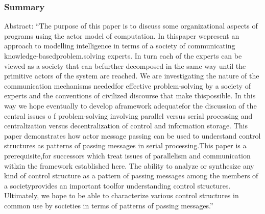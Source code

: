 \subsubsection*{Summary}
Abstract: ``The purpose of this paper is to discuss some organizational aspects of programs using the actor model of computation. In thispaper wepresent an approach to modelling intelligence in terms of a society of communicating knowledge-basedproblem.solving experts. In turn each of the experts can be viewed as a society that can befurther decomposed in the same way until the primitive actors of the system are reached. We are investigating the nature of the communication mechanisms neededfor effective problem-solving by a society of experts and the conventions of civilized discourse that make thispossible. In this way we hope eventually to develop aframework adequatefor the discussion of the central issues o f problem-solving involving parallel versus serial processing and centralization versus decentralization of control and information storage. This paper demonstrates how actor message passing can be used to understand control structures as patterns of passing messages in serial processing.This paper is a prerequisite,for successors which treat issues of parallelism and communication witlzin the framework established here. The ability to analyze or synthesize any kind of control structure as a pattern of passing messages among the members of a societyprovides an important toolfor understanding control structures. Ultimately, we hope to be able to characterize various control structures in common use by societies in terms of patterns of passing messages.''
